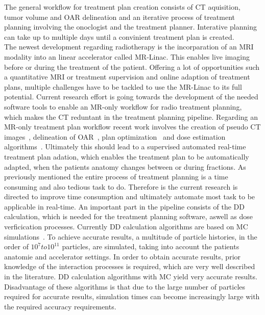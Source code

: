 The general workflow for treatment plan creation consists of \ac{CT} aquisition, tumor volume and \acs{OAR} delineation and an iterative process of treatment planning involving the onoclogist and the treatment planner. 
Interative planning can take up to multiple days until a convinient treatment plan is created.\\
The newest development regarding radiotherapy is the incorparation of an \ac{MRI} modality into an linear accelerator called MR-Linac. 
This enables live imaging before or during the treatment of the patient.
Offering a lot of opportunities such a quantitative \acs{MRI} or treatment supervision and online adaption of treatment plans, multiple challenges have to be tackled to use the MR-Linac to its full potential. 
Current research effort is going towards the development of the needed software tools to enable an MR-only workflow for radio treatment planning, which makes the \acs{CT} reduntant in the treatment planning pipeline. 
Regarding an MR-only treatment plan workflow recent work involves the creation of pseudo CT images~\cite{han_mr-based_2017, wolterink_deep_2017, dinkla_mr-only_2018}, delineation of \acs{OAR}~\cite{kazemifar_segmentation_2018, liang_deep-learning-based_2019, shen_medical_2019}, plan optimization~\cite{fan_automatic_2019, liu_deep_2019} and dose estimation algorithms~\cite{javaid_mitigating_2019}.
Ultimately this should lead to a supervised automated real-time treatment plan adation, which enables the treatment plan to be automatically adapted, when the patients anatomy changes between or during fractions.
As previously mentioned the entire process of treatment planning is a time consuming and also tedious task to do. 
Therefore is the current research is directed to improve time consumption and ultimately automate most task to be applicable in real-time.
An important part in the pipeline consists of the \ac{DD} calculation, which is needed for the treatment planning software, aswell as dose verficication processes.
Currently \acs{DD} calculation algorithms are based on \ac{MC} simulations~\cite{jabbari_review_2011}. 
To achieve accurate results, a multitude of particle histories, in the order of $10^7 to 10^{11}$ particles, are simulated, taking into account the patients anatomie and accelerator settings.
In order to obtain accurate results, prior knowledge of the interaction processes is required, which are very well described in the literature.
\acs{DD} calculation algorithms with \acs{MC} yield very accurate results. 
Disadvantage of these algorithms is that due to the large number of particles required for accurate results, simulation times can become increasingly large with the required accuracy requirements.

